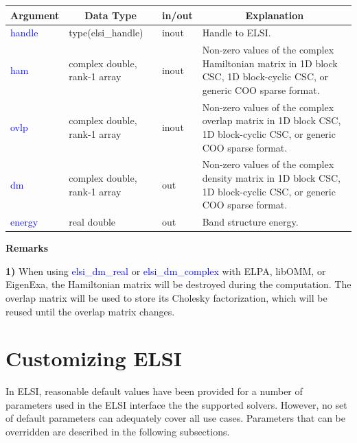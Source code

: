 \documentclass{report}
\begin{document}
\begin{tabular}[]{|p{20mm}|p{45mm}|p{15mm}|p{85mm}|}
\hline
\multicolumn{1}{|c|}{\textbf{Argument}} & \multicolumn{1}{c|}{\textbf{Data Type}} & \multicolumn{1}{c|}{\textbf{in/out}} & \multicolumn{1}{c|}{\textbf{Explanation}}\\
\hline
\textcolor{blue}{handle} & type(elsi\_handle)           & inout & Handle to ELSI.\\
\hline
\textcolor{blue}{ham}    & complex double, rank-1 array & inout & Non-zero values of the complex Hamiltonian matrix in 1D block CSC, 1D block-cyclic CSC, or generic COO sparse format.\\
\hline
\textcolor{blue}{ovlp}   & complex double, rank-1 array & inout & Non-zero values of the complex overlap matrix in 1D block CSC, 1D block-cyclic CSC, or generic COO sparse format.\\
\hline
\textcolor{blue}{dm}     & complex double, rank-1 array & out   & Non-zero values of the complex density matrix in 1D block CSC, 1D block-cyclic CSC, or generic COO sparse format.\\
\hline
\textcolor{blue}{energy} & real double                  & out   & Band structure energy.\\
\hline
\end{tabular}

\textbf{Remarks}

\textbf{1)} When using \textcolor{blue}{elsi\_dm\_real} or \textcolor{blue}{elsi\_dm\_complex} with ELPA, libOMM, or EigenExa, the Hamiltonian matrix will be destroyed during the computation. The overlap matrix will be used to store its Cholesky factorization, which will be reused until the overlap matrix changes.

\section{Customizing ELSI}
\label{sec:setter}
In ELSI, reasonable default values have been provided for a number of parameters used in the ELSI interface the the supported solvers. However, no set of default parameters can adequately cover all use cases. Parameters that can be overridden are described in the following subsections.
\end{document}
